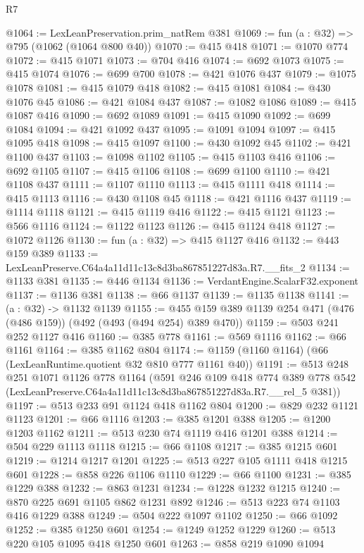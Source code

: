 \begin{lexlean}{R7}
\begin{coremodule}
@1064 := LexLeanPreservation.prim_natRem @381
@1069 := fun (a : @32) => @795 (@1062 (@1064 @800 @40))
@1070 := @415 @418
@1071 := @1070 @774
@1072 := @415 @1071
@1073 := @704 @416
@1074 := @692 @1073
@1075 := @415 @1074
@1076 := @699 @700
@1078 := @421 @1076 @437
@1079 := @1075 @1078
@1081 := @415 @1079 @418
@1082 := @415 @1081
@1084 := @430 @1076 @45
@1086 := @421 @1084 @437
@1087 := @1082 @1086
@1089 := @415 @1087 @416
@1090 := @692 @1089
@1091 := @415 @1090
@1092 := @699 @1084
@1094 := @421 @1092 @437
@1095 := @1091 @1094
@1097 := @415 @1095 @418
@1098 := @415 @1097
@1100 := @430 @1092 @45
@1102 := @421 @1100 @437
@1103 := @1098 @1102
@1105 := @415 @1103 @416
@1106 := @692 @1105
@1107 := @415 @1106
@1108 := @699 @1100
@1110 := @421 @1108 @437
@1111 := @1107 @1110
@1113 := @415 @1111 @418
@1114 := @415 @1113
@1116 := @430 @1108 @45
@1118 := @421 @1116 @437
@1119 := @1114 @1118
@1121 := @415 @1119 @416
@1122 := @415 @1121
@1123 := @566 @1116
@1124 := @1122 @1123
@1126 := @415 @1124 @418
@1127 := @1072 @1126
@1130 := fun (a : @32) => @415 @1127 @416
@1132 := @443 @159 @389
@1133 := LexLeanPreserve.C64a4a11d11c13c8d3ba867851227d83a.R7.__fits_2
@1134 := @1133 @381
@1135 := @446 @1134
@1136 := VerdantEngine.ScalarF32.exponent
@1137 := @1136 @381
@1138 := @66 @1137
@1139 := @1135 @1138
@1141 := (a : @32) -> @1132 @1139
@1155 := @455 @159 @389 @1139 @254 @471 (@476 (@486 @159)) (@492 (@493 (@494 @254) @389 @470))
@1159 := @503 @241 @252 @1127 @416
@1160 := @385 @778
@1161 := @569 @1116
@1162 := @66 @1161
@1164 := @385 @1162 @804
@1174 := @1159 (@1160 @1164) (@66 (LexLeanRuntime.quotient @32 @810 @777 @1161 @40))
@1191 := @513
    @248
    @251
    @1071
    @1126
    @778
    @1164
    (@591
      @246
      @109
      @418
      @774
      @389
      @778
      @542
      (LexLeanPreserve.C64a4a11d11c13c8d3ba867851227d83a.R7.__rel_5 @381))
@1197 := @513 @233 @91 @1124 @418 @1162 @804
@1200 := @829 @232 @1121 @1123
@1201 := @66 @1116
@1203 := @385 @1201 @388
@1205 := @1200 @1203 @1162
@1211 := @513 @230 @74 @1119 @416 @1201 @388
@1214 := @504 @229 @1113 @1118
@1215 := @66 @1108
@1217 := @385 @1215 @601
@1219 := @1214 @1217 @1201
@1225 := @513 @227 @105 @1111 @418 @1215 @601
@1228 := @858 @226 @1106 @1110
@1229 := @66 @1100
@1231 := @385 @1229 @388
@1232 := @863 @1231
@1234 := @1228 @1232 @1215
@1240 := @870 @225 @691 @1105 @862 @1231 @892
@1246 := @513 @223 @74 @1103 @416 @1229 @388
@1249 := @504 @222 @1097 @1102
@1250 := @66 @1092
@1252 := @385 @1250 @601
@1254 := @1249 @1252 @1229
@1260 := @513 @220 @105 @1095 @418 @1250 @601
@1263 := @858 @219 @1090 @1094

\end{coremodule}
\end{lexlean}
